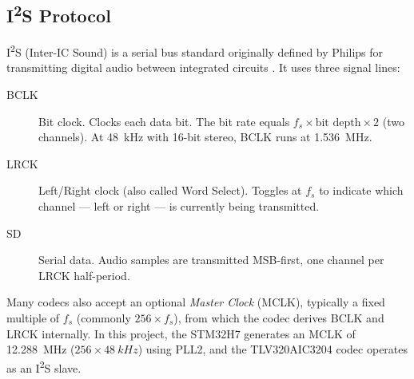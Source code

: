 \subsection{I\textsuperscript{2}S Protocol}
\label{sec:i2s-protocol}

I\textsuperscript{2}S (Inter-IC Sound) is a serial bus standard originally defined by Philips for transmitting digital audio between integrated circuits \cite{i2s_spec}.
It uses three signal lines:

\begin{description}
    \item[BCLK] Bit clock. Clocks each data bit. The bit rate equals $f_s \times \text{bit depth} \times 2$ (two channels).
    At \qty{48}{kHz} with 16-bit stereo, BCLK runs at \qty{1.536}{MHz}.

    \item[LRCK] Left/Right clock (also called Word Select). Toggles at $f_s$ to indicate which channel --- left or right --- is currently being transmitted.

    \item[SD] Serial data. Audio samples are transmitted MSB-first, one channel per LRCK half-period.
\end{description}

Many codecs also accept an optional \textit{Master Clock} (MCLK), typically a fixed multiple of $f_s$ (commonly $256 \times f_s$), from which the codec derives BCLK and LRCK internally.
In this project, the STM32H7 generates an MCLK of \qty{12.288}{MHz} ($256 \times \qty{48}{kHz}$) using PLL2, and the TLV320AIC3204 codec operates as an I\textsuperscript{2}S slave.
